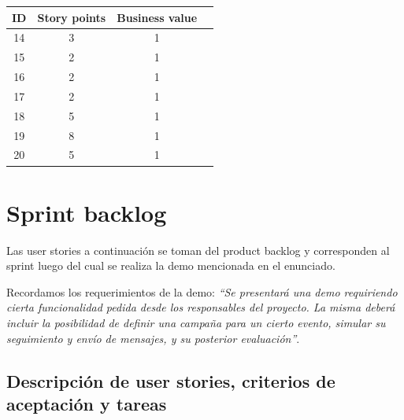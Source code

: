 \documentclass[a4paper, 10pt, twoside]{article}
\begin{document}
\begin{center}
\begin{tabular}{|c|c|c|c|}
\hline
ID & Story points & Business value\\
\hline
14 & 3 & 1\\
15 & 2 & 1\\
16 & 2 & 1\\
17 & 2 & 1\\
18 & 5 & 1\\
19 & 8 & 1\\
20 & 5 & 1\\
\hline
\end{tabular}
\end{center}


\newpage
\section{Sprint backlog}

Las user stories a continuación se toman del product backlog y corresponden al sprint luego del cual se realiza la demo mencionada en el enunciado.

Recordamos los requerimientos de la demo: \emph{``Se presentará una demo requiriendo cierta funcionalidad pedida desde los responsables del proyecto. La misma deberá incluir la posibilidad de definir una campaña para un cierto evento, simular su seguimiento y envío de mensajes, y su posterior evaluación''}.


\subsection{Descripción de user stories, criterios de aceptación y tareas}
\end{document}
